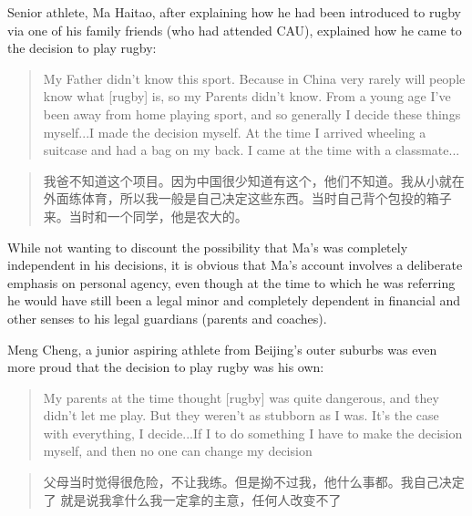 \begin{CJK}{UTF8}{gbsn}
Senior athlete, Ma Haitao, after explaining how he had been introduced to rugby via one of his family friends (who had attended CAU), explained how he came to the decision to play rugby:
     \begin{quote}
       My Father didn't know this sport.  Because in China very rarely will people know what [rugby] is, so my Parents didn't know. From a young age I've been away from home playing sport, and so generally I decide these things myself...I made the decision myself.  At the time I arrived wheeling a suitcase and had a bag on my back.  I came at the time with a classmate...
     \end{quote}
     \begin{quote}
       我爸不知道这个项目。因为中国很少知道有这个，他们不知道。我从小就在外面练体育，所以我一般是自己决定这些东西。当时自己背个包投的箱子来。当时和一个同学，他是农大的。
     \end{quote}

  While not wanting to discount the possibility that Ma's was completely independent in his decisions, it is obvious that Ma's account involves a deliberate emphasis on personal agency, even though at the time to which he was referring he would have still been a legal minor and completely dependent in financial and other senses to his legal guardians (parents and coaches).

  Meng Cheng, a junior aspiring athlete from Beijing's outer suburbs was even more proud that the decision to play rugby was his own:
       \begin{quote}
         My parents at the time thought [rugby] was quite dangerous, and they didn't let me play.  But they weren't as stubborn as I was.  It's the case with everything, I decide...If I to do something I have to make the decision myself, and then no one can change my decision\textellipsis
       \end{quote}
       \begin{quote}
         父母当时觉得很危险，不让我练。但是拗不过我，他什么事都。我自己决定了\textellipsis
         就是说我拿什么我一定拿的主意，任何人改变不了\textellipsis
       \end{quote}


\end{CJK}
